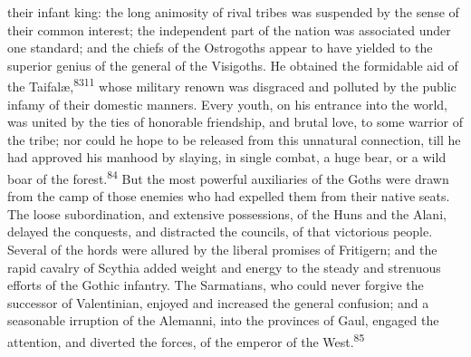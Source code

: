 their infant king: the long animosity of rival tribes was
suspended by the sense of their common interest; the independent
part of the nation was associated under one standard; and the
chiefs of the Ostrogoths appear to have yielded to the superior
genius of the general of the Visigoths. He obtained the
formidable aid of the Taifalæ,\textsuperscript{8311} whose military renown was
disgraced and polluted by the public infamy of their domestic
manners. Every youth, on his entrance into the world, was united
by the ties of honorable friendship, and brutal love, to some
warrior of the tribe; nor could he hope to be released from this
unnatural connection, till he had approved his manhood by
slaying, in single combat, a huge bear, or a wild boar of the
forest.\textsuperscript{84} But the most powerful auxiliaries of the Goths were
drawn from the camp of those enemies who had expelled them from
their native seats. The loose subordination, and extensive
possessions, of the Huns and the Alani, delayed the conquests,
and distracted the councils, of that victorious people. Several
of the hords were allured by the liberal promises of Fritigern;
and the rapid cavalry of Scythia added weight and energy to the
steady and strenuous efforts of the Gothic infantry. The
Sarmatians, who could never forgive the successor of Valentinian,
enjoyed and increased the general confusion; and a seasonable
irruption of the Alemanni, into the provinces of Gaul, engaged
the attention, and diverted the forces, of the emperor of the
West.\textsuperscript{85}




